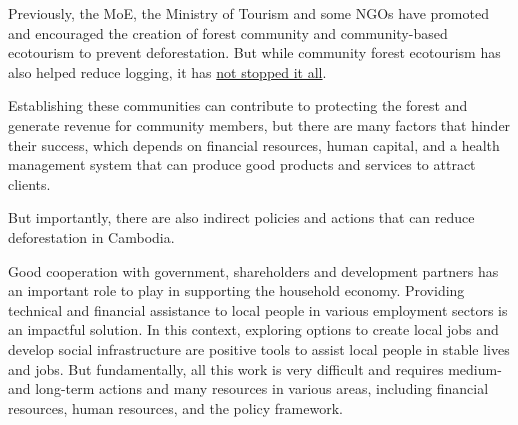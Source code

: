 \documentclass[10pt,a4paper]{letter}
\begin{document}
Previously, the MoE, the Ministry of Tourism and some NGOs have promoted and encouraged the creation of forest community and community-based ecotourism to prevent deforestation. But while community forest ecotourism has also helped reduce logging, it has \href{https://link.springer.com/chapter/10.1007%2F978-981-15-8632-3_9}{not stopped it all}. 

Establishing these communities can contribute to protecting the forest and generate revenue for community members, but there are many factors that hinder their success, which depends on financial resources, human capital, and a health management system that can produce good products and services to attract clients.

But importantly, there are also indirect policies and actions that can reduce deforestation in Cambodia. 

Good cooperation with government, shareholders and development partners has an important role to play in supporting the household economy. Providing technical and financial assistance to local people in various employment sectors is an impactful solution. In this context, exploring options to create local jobs and develop social infrastructure are positive tools to assist local people in stable lives and jobs. 
But fundamentally, all this work is very difficult and requires medium- and long-term actions and many resources in various areas, including financial resources, human resources, and the policy framework.
\end{document}
